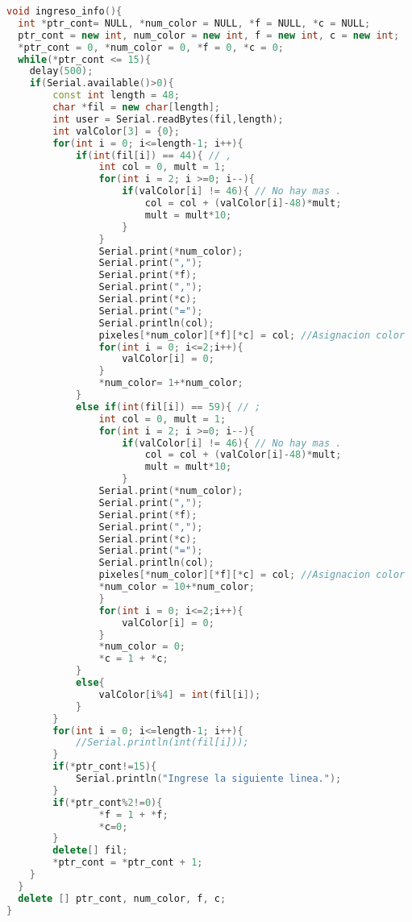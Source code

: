 \documentclass{article}
\begin{document}
\begin{lstlisting}[language=C++, label=error_guardarints]
void ingreso_info(){
  int *ptr_cont= NULL, *num_color = NULL, *f = NULL, *c = NULL;
  ptr_cont = new int, num_color = new int, f = new int, c = new int;
  *ptr_cont = 0, *num_color = 0, *f = 0, *c = 0;
  while(*ptr_cont <= 15){
  	delay(500);
    if(Serial.available()>0){
    	const int length = 48;
    	char *fil = new char[length];
      	int user = Serial.readBytes(fil,length);
      	int valColor[3] = {0};
      	for(int i = 0; i<=length-1; i++){
        	if(int(fil[i]) == 44){ // ,
          		int col = 0, mult = 1;
          		for(int i = 2; i >=0; i--){
            		if(valColor[i] != 46){ // No hay mas .
              			col = col + (valColor[i]-48)*mult;
              			mult = mult*10;
            		}
                }
              	Serial.print(*num_color);
                Serial.print(",");
                Serial.print(*f);
                Serial.print(",");
                Serial.print(*c);
                Serial.print("=");
                Serial.println(col);
              	pixeles[*num_color][*f][*c] = col; //Asignacion color
                for(int i = 0; i<=2;i++){
                	valColor[i] = 0;
              	}
              	*num_color= 1+*num_color;
    	    }
        	else if(int(fil[i]) == 59){ // ;
              	int col = 0, mult = 1;
          		for(int i = 2; i >=0; i--){
            		if(valColor[i] != 46){ // No hay mas .
              			col = col + (valColor[i]-48)*mult;
              			mult = mult*10;
            		}
                Serial.print(*num_color);
                Serial.print(",");
                Serial.print(*f);
                Serial.print(",");
                Serial.print(*c);
                Serial.print("=");
                Serial.println(col);
            	pixeles[*num_color][*f][*c] = col; //Asignacion color
                *num_color = 10+*num_color;
                }
              	for(int i = 0; i<=2;i++){
                	valColor[i] = 0;
              	}
          		*num_color = 0;
          		*c = 1 + *c;
        	}
            else{
            	valColor[i%4] = int(fil[i]);
            }
      	}
      	for(int i = 0; i<=length-1; i++){
        	//Serial.println(int(fil[i]));
        }
      	if(*ptr_cont!=15){
        	Serial.println("Ingrese la siguiente linea.");
      	}
      	if(*ptr_cont%2!=0){
          		*f = 1 + *f;
          		*c=0;
       	}
      	delete[] fil;
	    *ptr_cont = *ptr_cont + 1;
    }
  }
  delete [] ptr_cont, num_color, f, c;
}
\end{lstlisting}
\end{document}
